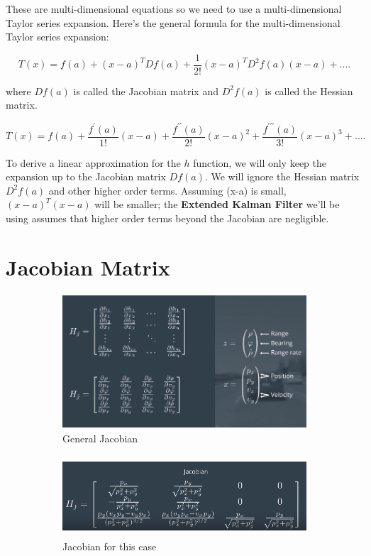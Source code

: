 \documentclass[11pt, a4paper]{article}
\begin{document}
These are multi-dimensional equations so we need to use a multi-dimensional Taylor series expansion. Here's the general formula for the multi-dimensional Taylor series expansion:


\[
T(x)=f(a)+(x-a)^{T} D f(a)+\frac{1}{2 !}(x-a)^{T} D^{2} f(a)(x-a)+\ldots
.\] 




where $D f(a)$ is called the Jacobian matrix and $D^2 f(a)$ is called the Hessian matrix.



\[
T(x)=f(a)+\frac{f^{\prime}(a)}{1 !}(x-a)+\frac{f^{\prime \prime}(a)}{2 !}(x-a)^{2}+\frac{f^{\prime \prime \prime}(a)}{3 !}(x-a)^{3}+\ldots
.\]





To derive a linear approximation for the $h$ function, we will only keep the expansion up to the Jacobian matrix $D f(a)$. We will ignore the Hessian matrix $D^2 f(a)$ and other higher order terms. Assuming (x-a) is small, $(x-a)^T(x-a)$ will be smaller; the \textbf{Extended Kalman Filter} we'll be using assumes that higher order terms beyond the Jacobian are negligible.




\section{Jacobian Matrix}%
\label{sec:jacobian_matrix}


\begin{figure}[htpb!]
\centering
\begin{subfigure}[b]{0.9\textwidth}
   \includegraphics[width=1\linewidth, height=5cm]{jacobian_p1}
   \caption{General Jacobian}
   \label{fig:jacobian_p1} 
\end{subfigure}

\begin{subfigure}[b]{0.9\textwidth}
   \includegraphics[width=1\linewidth, height=3cm]{jacobian_p2}
   \caption{Jacobian for this case}
   \label{fig:jacobian_p2}
\end{subfigure}

\caption[]{}
\end{figure}
\end{document}
